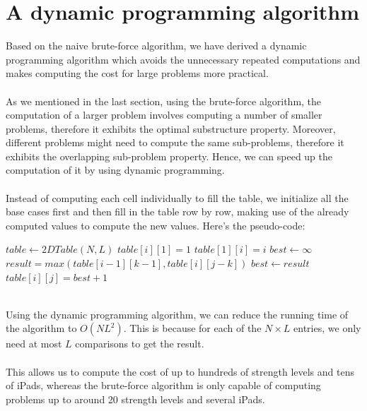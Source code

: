 \documentclass[12pt,a4paper,oneside]{report}
\begin{document}
\section{A dynamic programming algorithm}
Based on the naive brute-force algorithm, we have derived a dynamic programming algorithm which avoids the unnecessary repeated computations and makes computing the cost for large problems more practical. \\\\
As we mentioned in the last section, using the brute-force algorithm, the computation of a larger problem involves computing a number of smaller problems, therefore it exhibits the optimal substructure property. Moreover, different problems might need to compute the same sub-problems, therefore it exhibits the overlapping sub-problem property. Hence, we can speed up the computation of it by using dynamic programming. \\\\
Instead of computing each cell individually to fill the table, we initialize all the base cases first and then fill in the table row by row, making use of the already computed values to compute the new values. Here's the pseudo-code:
\begin{algorithm}
\caption{$makeTable(N, L)$}
\begin{algorithmic}[1]
\STATE $table \leftarrow 2DTable(N, L)$
	\STATE $table[i][1] = 1$
\ENDFOR
{}
	\STATE $table[1][i] = i$
\ENDFOR
{}
		\STATE $best \leftarrow \infty$
			\STATE $result = max(table[i - 1][k - 1], table[i][j - k])$
				\STATE $best \leftarrow result$
			\ENDIF
		\ENDFOR
		\STATE $table[i][j] = best + 1$
	\ENDFOR
\ENDFOR
\end{algorithmic}
\end{algorithm}
~\\
Using the dynamic programming algorithm, we can reduce the running time of the algorithm to $O(NL^2)$. This is because for each of the $N \times L$ entries, we only need at most $L$ comparisons to get the result. \\\\
This allows us to compute the cost of up to hundreds of strength levels and tens of iPads, whereas the brute-force algorithm is only capable of computing problems up to around 20 strength levels and several iPads.
\end{document}
